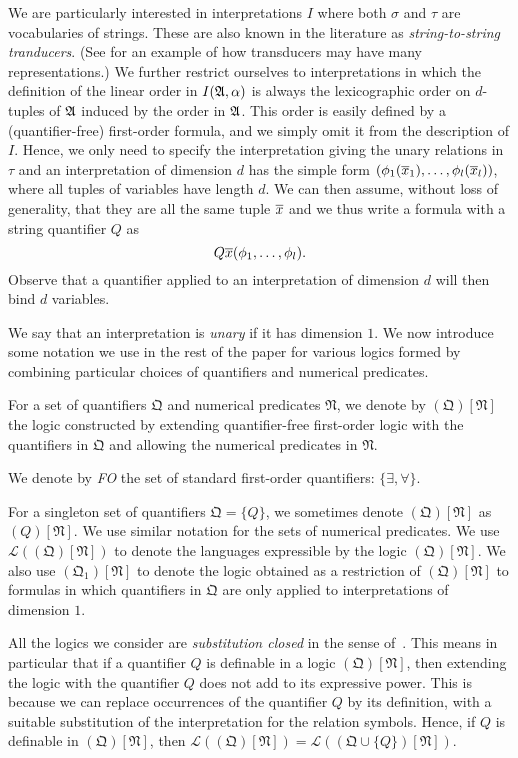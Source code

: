 \documentclass[a4paper,UKenglish,cleveref, autoref, thm-restate, anonymous]{lipics-v2021}
\begin{document}
We are particularly interested in interpretations $I$ where both $\sigma$ and $\tau$ are vocabularies of strings.  These are also known in the literature as \emph{string-to-string tranducers}. (See \cite{bojanczyk2022transducers} for an example of how transducers may have many representations.)  We further restrict ourselves to interpretations in which the definition of the linear order in $I(\mathfrak{A},\alpha)$ is always the lexicographic order on $d$-tuples of $\mathfrak{A}$ induced by the order in $\mathfrak{A}$.  This order is easily defined by a (quantifier-free) first-order formula, and we simply omit it from the description of $I$.  Hence, we only need to specify the interpretation giving the unary relations in $\tau$ and an interpretation of dimension $d$ has the simple form $(\phi_1(\overline{x}_1),\ldots, \phi_l(\overline{x}_l))$, where all tuples of variables have length $d$.  We can then assume, without loss of generality, that they are all the same tuple $\overline{x}$ and we thus write a formula with a string quantifier $Q$ as
$$Q \overline{x} (\phi_1,\ldots,\phi_l).$$
Observe that a quantifier applied to an interpretation of dimension $d$ will then bind $d$ variables.

We say that an interpretation is \emph{unary} if it has dimension $1$.  We now introduce some notation we use in the rest of the paper for various logics formed by combining particular choices of quantifiers and numerical predicates.
\begin{definition}
  For a set of quantifiers $\mathfrak{Q}$ and numerical predicates $\mathfrak{N}$, we denote by $(\mathfrak{Q})[\mathfrak{N}]$ the logic constructed by extending quantifier-free first-order logic with the quantifiers in $\mathfrak{Q}$ and allowing the numerical predicates in $\mathfrak{N}$.

   We denote by \emph{FO} the set of standard first-order quantifiers: $\{\exists, \forall\}$.
\end{definition}
For a singleton set of quantifiers $\mathfrak{Q} = \{Q\}$, we sometimes denote $(\mathfrak{Q})[\mathfrak{N}]$ as $(Q)[\mathfrak{N}]$. We use similar notation for the sets of numerical predicates. We use $\mathcal{L}((\mathfrak{Q})[\mathfrak{N}])$ to denote the languages expressible by the logic $(\mathfrak{Q})[\mathfrak{N}]$.  We also use $(\mathfrak{Q}_1)[\mathfrak{N}]$ to denote the logic obtained as a restriction of $(\mathfrak{Q})[\mathfrak{N}]$ to formulas in which quantifiers in $\mathfrak{Q}$ are only applied to interpretations of dimension $1$.

All the logics we consider are \emph{substitution closed} in the sense of~\cite{Ebb85}.  This means in particular that if a quantifier $Q$ is definable in a logic $(\mathfrak{Q})[\mathfrak{N}]$, then extending the logic with the quantifier $Q$ does not add to its expressive power.  This is because we can replace occurrences of the quantifier $Q$ by its definition, with a suitable substitution of the interpretation for the relation symbols.  Hence, if $Q$ is definable in $(\mathfrak{Q})[\mathfrak{N}]$, then $\mathcal{L}((\mathfrak{Q})[\mathfrak{N}]) = \mathcal{L}((\mathfrak{Q} \cup \{Q\})[\mathfrak{N}])$.
\end{document}
